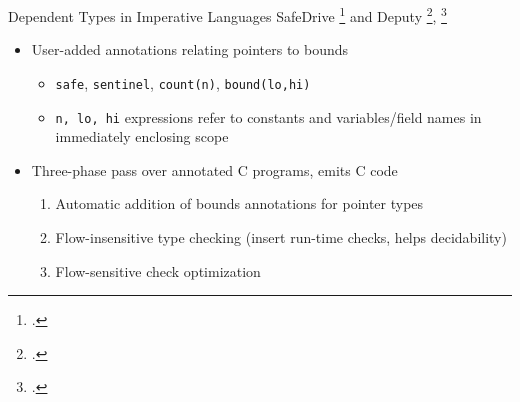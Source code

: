 \documentclass[aspectratio=169]{beamer}
\begin{document}
\begin{frame}{Dependent Types in Imperative Languages}
SafeDrive \footcite{zhou_safedrive:_2006} and Deputy \footcite{condit_dependent_2007}, \footcite{anderson_static_2007}
\vspace{-0.1in}
    \begin{itemize}
        \item User-added annotations relating pointers to bounds
            \begin{itemize}
                \item \texttt{safe}, \texttt{sentinel}, \texttt{count(n)}, \texttt{bound(lo,hi)}
                \item \texttt{n, lo, hi} expressions refer to constants and variables/field names in immediately enclosing scope
            \end{itemize}
        \item Three-phase pass over annotated C programs, emits C code
            \begin{enumerate}
                \item Automatic addition of bounds annotations for pointer types 
                \item Flow-insensitive type checking (insert run-time checks, helps decidability) 
                \item Flow-sensitive check optimization
            \end{enumerate}
    \end{itemize}
\end{frame}

\end{document}
